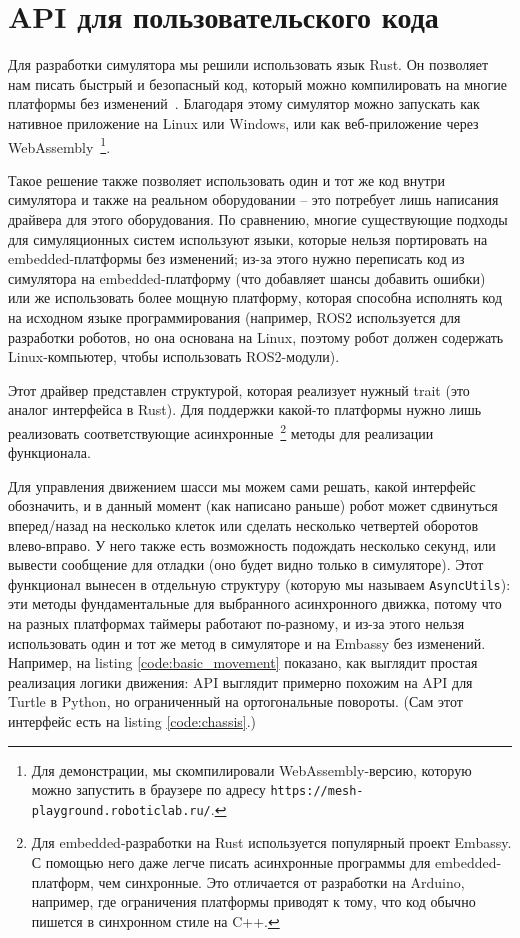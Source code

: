 \documentclass[%
]{report}
\begin{document}
\section{API для пользовательского кода}

Для разработки симулятора мы решили использовать язык Rust.
Он позволяет нам писать быстрый и безопасный код,
который можно компилировать на многие платформы без изменений~\cite{10.1145/2663171.2663188,klabnik2022rust}.
Благодаря этому симулятор можно запускать как нативное приложение на Linux или Windows,
или как веб-приложение через WebAssembly~\footnote{Для демонстрации,
мы скомпилировали WebAssembly-версию, которую можно запустить в браузере по адресу \texttt{https://mesh-playground.roboticlab.ru/}.}.

Такое решение также позволяет использовать один и тот же код внутри симулятора
и также на реальном оборудовании --
это потребует лишь написания драйвера для этого оборудования.
По сравнению, многие существующие подходы
для симуляционных систем
используют языки,
которые нельзя портировать на embedded-платформы без изменений;
из-за этого нужно переписать код из симулятора на embedded-платформу
(что добавляет шансы добавить ошибки)
или же использовать более мощную платформу, которая способна
исполнять код на исходном языке программирования
(например, ROS2 используется для разработки роботов,
но она основана на Linux, поэтому робот должен содержать
Linux-компьютер, чтобы использовать ROS2-модули).

Этот драйвер представлен структурой, которая реализует нужный trait (это аналог интерфейса в Rust).
Для поддержки какой-то платформы нужно лишь реализовать соответствующие асинхронные~\footnote{Для embedded-разработки
на Rust используется популярный проект Embassy. С помощью него даже легче писать асинхронные программы
для embedded-платформ, чем синхронные. Это отличается от разработки на Arduino, например,
где ограничения платформы приводят к тому,
что код обычно пишется в синхронном стиле на C++.}
 методы для реализации функционала.

Для управления движением шасси мы можем сами решать, какой интерфейс обозначить,
и в данный момент (как написано раньше)
робот может сдвинуться вперед/назад на несколько клеток или сделать несколько четвертей оборотов
влево-вправо.
У него также есть возможность подождать несколько секунд,
или вывести сообщение для отладки
(оно будет видно только в симуляторе).
Этот функционал вынесен в отдельную структуру
(которую мы называем \texttt{AsyncUtils}):
эти методы фундаментальные для выбранного асинхронного движка,
потому что на разных платформах таймеры работают по-разному,
и из-за этого нельзя использовать один и тот же метод 
в симуляторе и на Embassy без изменений.
Например, на listing \ref{code:basic_movement} показано,
как выглядит простая реализация логики движения:
API выглядит примерно похожим на API для Turtle в Python,
но ограниченный на ортогональные повороты.
(Сам этот интерфейс есть на listing \ref{code:chassis}.)
\end{document}
